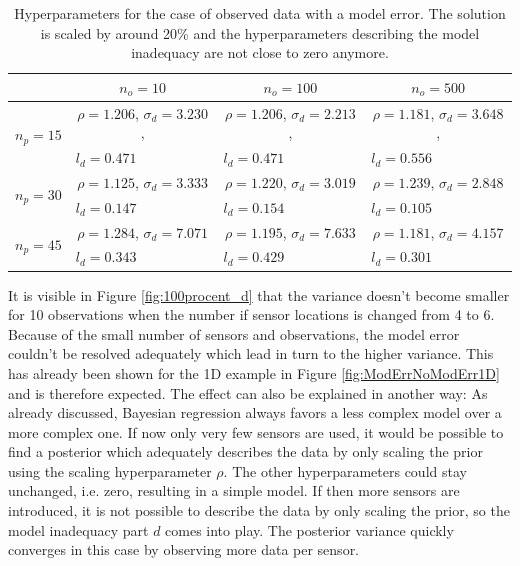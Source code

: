 \documentclass[%
  a4paper,oneside,%
  11pt,%
  smallchapters,
  style=printdev,
  extramargin,
  green,%
  rgb, <cmyk>
  ]{tubsbook}
\begin{document}
\begin{table}[!ht]
\centering
\caption{Hyperparameters for the case of observed data with a model error. The solution is scaled by around 20\% and the hyperparameters describing the model inadequacy are not close to zero anymore.}
\label{tab:100procWithError}
\begin{tabular}{@{}lccc@{}}
\toprule
                            & $n_o = 10$                      & $n_o = 100$                     & $n_o = 500$                     \\ \midrule
\multirow{2}{*}{$n_p = 15$} & $\rho=1.206$, $\sigma_d=3.230$, & $\rho=1.206$, $\sigma_d=2.213$, & $\rho=1.181$, $\sigma_d=3.648$, \\
                            & \multicolumn{1}{l}{$l_d=0.471$} & \multicolumn{1}{l}{$l_d=0.471$} & \multicolumn{1}{l}{$l_d=0.556$} \\
\multirow{2}{*}{$n_p = 30$} & $\rho=1.125$, $\sigma_d=3.333$  & $\rho=1.220$, $\sigma_d=3.019$  & $\rho=1.239$, $\sigma_d=2.848$  \\
                            & \multicolumn{1}{l}{$l_d=0.147$} & \multicolumn{1}{l}{$l_d=0.154$} & \multicolumn{1}{l}{$l_d=0.105$} \\
\multirow{2}{*}{$n_p = 45$} & $\rho=1.284$, $\sigma_d=7.071$  & $\rho=1.195$, $\sigma_d=7.633$  & $\rho=1.181$, $\sigma_d=4.157$  \\
                            & \multicolumn{1}{l}{$l_d=0.343$} & \multicolumn{1}{l}{$l_d=0.429$} & \multicolumn{1}{l}{$l_d=0.301$} \\ \bottomrule
\end{tabular}
\end{table}
%
It is visible in Figure \ref{fig:100procent_d} that the variance doesn't become smaller for 10 observations when the number if sensor locations is changed from 4 to 6. Because of the small number of sensors and observations, the model error couldn't be resolved adequately which lead in turn to the higher variance. This has already been shown for the 1D example in Figure \ref{fig:ModErrNoModErr1D} and is therefore expected. The effect can also be explained in another way: As already discussed, Bayesian regression always favors a less complex model over a more complex one. If now only very few sensors are used, it would be possible to find a posterior which adequately describes the data by only scaling the prior using the scaling hyperparameter $\rho$. The other hyperparameters could stay unchanged, i.e. zero, resulting in a simple model. If then more sensors are introduced, it is not possible to describe the data by only scaling the prior, so the model inadequacy part $d$ comes into play. The posterior variance quickly converges in this case by observing more data per sensor.
\end{document}
